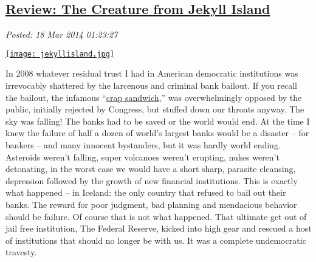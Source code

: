 %

\subsection*{\href{https://bakerjd99.wordpress.com/2014/03/17/review-the-creature-from-jekyll-island/}{Review: The Creature from Jekyll Island}}


\noindent\emph{Posted: 18 Mar 2014 01:23:27}
\vspace{6pt}

\captionsetup[floatingfigure]{labelformat=empty}
\begin{floatingfigure}[l]{0.222\textwidth}
\centering
\href{http://www.amazon.com/The-Creature-Jekyll-Island-Federal/dp/0912986212}{\texttt{[image: jekyllisland.jpg]}}
\label{fig:4568X0}
\end{floatingfigure} In
2008 whatever residual trust I had in American democratic institutions
was irrevocably shattered by the larcenous and criminal bank bailout. If
you recall the bailout, the infamous
``\href{http://abcnews.go.com/blogs/politics/2008/10/a-second-order/}{crap
sandwich},'' was overwhelmingly opposed by the public, initially
rejected by Congress, but stuffed down our throats anyway. The sky was
falling! The banks had to be saved or the world would end. At the time I
knew the failure of half a dozen of world's largest banks would be a
disaster -- for bankers -- and many innocent bystanders, but it was
hardly world ending. Asteroids weren't falling, super volcanoes weren't
erupting, nukes weren't detonating, in the worst case we would have a
short sharp, parasite cleansing, depression followed by the growth of
new financial institutions. This is exactly what happened -- in Iceland:
the only country that refused to bail out their banks. The reward for
poor judgment, bad planning and mendacious behavior should be failure.
Of course that is not what happened. That ultimate get out of jail free
institution, The Federal Reserve, kicked into high gear and rescued a
host of institutions that should no longer be with us. It was a complete
undemocratic travesty.


